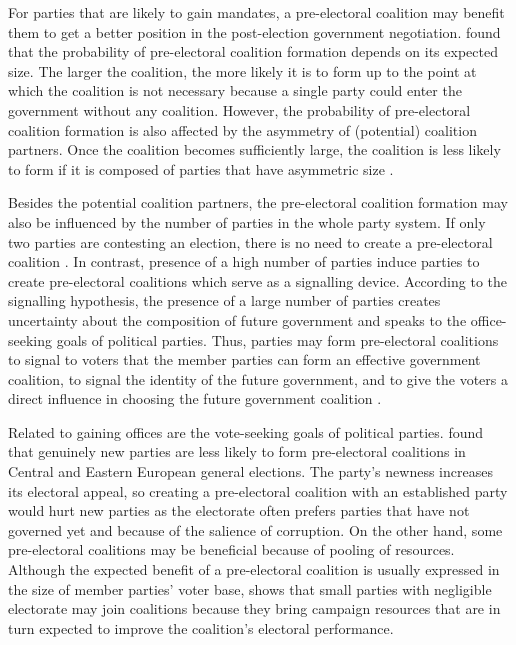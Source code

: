 \documentclass[]{interact}
\theoremstyle{plain}%
\theoremstyle{definition}
\theoremstyle{remark}
\begin{document}
For parties that are likely to gain mandates, a pre-electoral coalition may benefit them to get a better position in the post-election government negotiation. \citet{golder2006b} found that the probability of pre-electoral coalition formation depends on its expected size. The larger the coalition, the more likely it is to form up to the point at which the coalition is not necessary because a single party could enter the government without any coalition. However, the probability of pre-electoral coalition formation is also affected by the asymmetry of (potential) coalition partners. Once the coalition becomes sufficiently large, the coalition is less likely to form if it is composed of parties that have asymmetric size \citep[199]{golder2006b}. 

Besides the potential coalition partners, the pre-electoral coalition formation may also be influenced by the number of parties in the whole party system. 
If only two parties are contesting an election, there is no need to create a pre-electoral coalition \citep{golder2005}. In contrast, presence of a high number of parties induce parties to create pre-electoral coalitions which serve as a signalling device. According to the signalling hypothesis, the presence of a large number of parties creates uncertainty about the composition of future government and speaks to the office-seeking goals of political parties. Thus, parties may form pre-electoral coalitions to signal to voters that the member parties can form an effective government coalition, to signal the identity of the future government, and to give the voters a direct influence in choosing the future government coalition \citep{golder2005}.

Related to gaining offices are the vote-seeking goals of political parties. \citet{ibenskas2016} found that genuinely new parties are less likely to form pre-electoral coalitions in Central and Eastern European general elections. The party's newness increases its electoral appeal, so creating a pre-electoral coalition with an established party would hurt new parties as the electorate often prefers parties that have not governed yet and because of the salience of corruption. On the other hand, some pre-electoral coalitions may be beneficial because of pooling of resources. Although the expected benefit of a pre-electoral coalition is usually expressed in the size of member parties' voter base, \citet{silva2022} shows that small parties with negligible electorate may join coalitions because they bring campaign resources that are in turn expected to improve the coalition's electoral performance.
\end{document}

